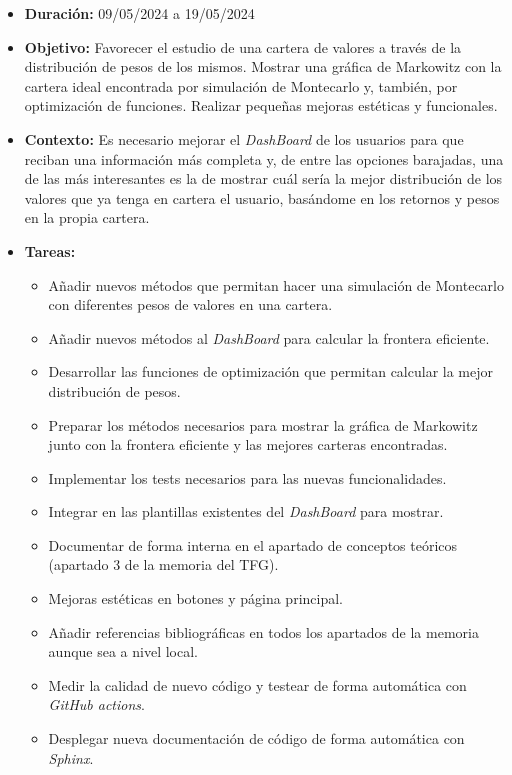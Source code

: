 \begin{itemize}
\item  
\textbf{Duración:} 09/05/2024 a 19/05/2024

\item
\textbf{Objetivo:} Favorecer el estudio de una cartera de valores a través de la distribución de pesos de los mismos. Mostrar una gráfica de Markowitz con la cartera ideal encontrada por simulación de Montecarlo y, también, por optimización de funciones. Realizar pequeñas mejoras estéticas y funcionales. 


\item
\textbf{Contexto:} Es necesario mejorar el \emph{DashBoard} de los usuarios para que reciban una información más completa y, de entre las opciones barajadas, una de las más interesantes es la de mostrar cuál sería la mejor distribución de los valores que ya tenga en cartera el usuario, basándome en los retornos y pesos en la propia cartera. 


\item
\textbf{Tareas:}
	\begin{itemize}
	\tightlist
	\item 
	Añadir nuevos métodos que permitan hacer una simulación de Montecarlo con diferentes pesos de valores en una cartera. 
	\item
	Añadir nuevos métodos al \emph{DashBoard} para calcular la frontera eficiente. 
	\item
	Desarrollar las funciones de optimización que permitan calcular la mejor distribución de pesos.
	\item
	Preparar los métodos necesarios para mostrar la gráfica de Markowitz junto con la frontera eficiente y las mejores carteras encontradas. 
	\item
	Implementar los tests necesarios para las nuevas funcionalidades. 
	\item
	Integrar en las plantillas existentes del \emph{DashBoard} para mostrar. 
	\item
	Documentar de forma interna en el apartado de conceptos teóricos (apartado 3 de la memoria del TFG). 
	\item
	Mejoras estéticas en botones y página principal. 
	\item
	Añadir referencias bibliográficas en todos los apartados de la memoria aunque sea a nivel local. 
	\item
	Medir la calidad de nuevo código y testear de forma automática con \emph{GitHub actions}. 
	\item
	Desplegar nueva documentación de código de forma automática con \emph{Sphinx}. 
  	\end{itemize}
\end{itemize}



